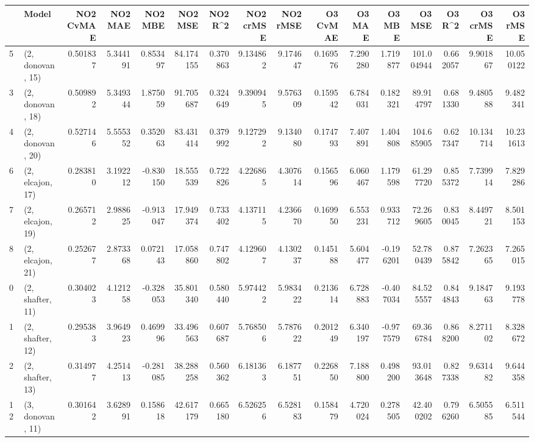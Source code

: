 \begin{tabular}{llrrrrrrrrrrrrrr}
\toprule
{} &             Model &  NO2 CvMAE &   NO2 MAE &   NO2 MBE &    NO2 MSE &   NO2 R\textasciicircum2 &  NO2 crMSE &  NO2 rMSE &  O3 CvMAE &    O3 MAE &    O3 MBE &      O3 MSE &    O3 R\textasciicircum2 &   O3 crMSE &    O3 rMSE \\
\midrule
5  &  (2, donovan, 15) &   0.501837 &  5.344191 &  0.853497 &  84.174155 &  0.370863 &   9.134862 &  9.174647 &  0.169576 &  7.290280 &  1.719877 &  101.004944 &  0.662057 &   9.901867 &  10.050122 \\
3  &  (2, donovan, 18) &   0.509892 &  5.349344 &  1.875059 &  91.705687 &  0.324649 &   9.390945 &  9.576309 &  0.159542 &  6.784031 &  0.182321 &   89.914797 &  0.681330 &   9.480588 &   9.482341 \\
4  &  (2, donovan, 20) &   0.527146 &  5.555352 &  0.352063 &  83.431414 &  0.379992 &   9.127292 &  9.134080 &  0.174793 &  7.407891 &  1.404808 &  104.685905 &  0.627347 &  10.134714 &  10.231613 \\
6  &  (2, elcajon, 17) &   0.283810 &  3.192212 & -0.830150 &  18.555539 &  0.722826 &   4.226865 &  4.307614 &  0.156596 &  6.060467 &  1.179598 &   61.297720 &  0.855372 &   7.739914 &   7.829286 \\
7  &  (2, elcajon, 19) &   0.265712 &  2.988625 & -0.913047 &  17.949374 &  0.733402 &   4.137115 &  4.236670 &  0.169950 &  6.553231 &  0.933712 &   72.269605 &  0.830045 &   8.449721 &   8.501153 \\
8  &  (2, elcajon, 21) &   0.252677 &  2.873368 &  0.072143 &  17.058860 &  0.747802 &   4.129607 &  4.130237 &  0.145188 &  5.604477 & -0.196201 &   52.780439 &  0.875842 &   7.262365 &   7.265015 \\
0  &  (2, shafter, 11) &   0.304023 &  4.121258 & -0.328053 &  35.801340 &  0.580440 &   5.974422 &  5.983422 &  0.213614 &  6.728883 & -0.407034 &   84.525557 &  0.844843 &   9.184763 &   9.193778 \\
1  &  (2, shafter, 12) &   0.295383 &  3.964923 &  0.469996 &  33.496563 &  0.607687 &   5.768506 &  5.787622 &  0.201249 &  6.340197 & -0.977579 &   69.366784 &  0.868200 &   8.271102 &   8.328672 \\
2  &  (2, shafter, 13) &   0.314977 &  4.251413 & -0.281085 &  38.288258 &  0.560362 &   6.181363 &  6.187751 &  0.226850 &  7.188800 &  0.498200 &   93.013648 &  0.827338 &   9.631482 &   9.644358 \\
12 &  (3, donovan, 11) &   0.301642 &  3.628991 &  0.158618 &  42.617179 &  0.665180 &   6.526256 &  6.528183 &  0.158479 &  4.720024 &  0.278505 &   42.400202 &  0.796260 &   6.505585 &   6.511544 \\

\end{tabular}
